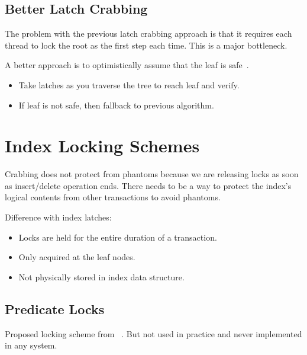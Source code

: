 \documentclass[11pt]{article}
\begin{document}
\subsection*{Better Latch Crabbing}
The problem with the previous latch crabbing approach is that it requires each thread to lock the 
root as the first step each time. This is a major bottleneck.

A better approach is to optimistically assume that the leaf is safe~\cite{a1-bayer}.
\begin{itemize}
    \item
    Take  latches as you traverse the tree to reach leaf and verify.
    
    \item
    If leaf is not safe, then fallback to previous algorithm.
\end{itemize}

\section{Index Locking Schemes}
Crabbing does not protect from phantoms because we are releasing locks as soon as 
insert/delete operation ends. There needs to be a way to protect the index's logical contents from 
other transactions to avoid phantoms.

Difference with index latches:
\begin{itemize}
    \item
    Locks are held for the entire duration of a transaction.
    
    \item
    Only acquired at the leaf nodes.
    
    \item
    Not physically stored in index data structure.
\end{itemize}

\subsection*{Predicate Locks}
Proposed locking scheme from ~\cite{p624-eswaran}. But not used in practice and 
never implemented in any system.
\end{document}
